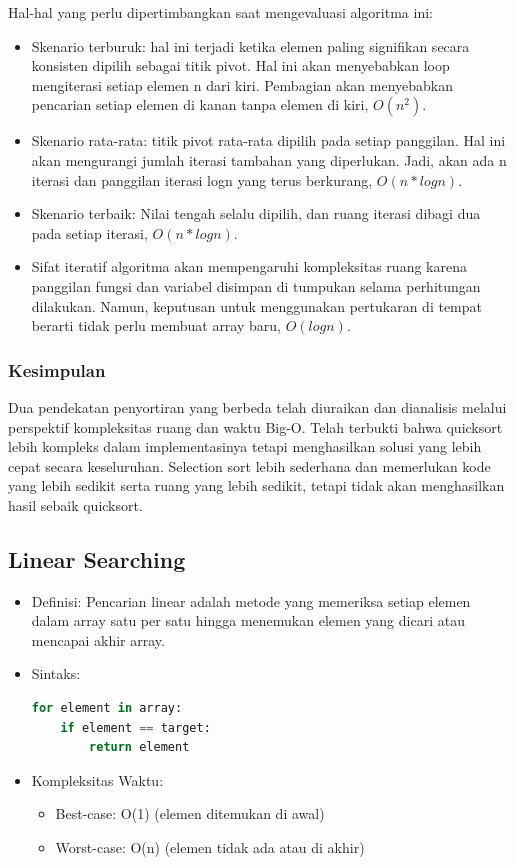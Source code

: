 \documentclass{article}
\begin{document}
Hal-hal yang perlu dipertimbangkan saat mengevaluasi algoritma ini:
\begin{itemize}
    \item Skenario terburuk: hal ini terjadi ketika elemen paling signifikan secara konsisten dipilih sebagai titik pivot. Hal ini akan menyebabkan loop mengiterasi setiap elemen n dari kiri. Pembagian akan menyebabkan pencarian setiap elemen di kanan tanpa elemen di kiri, \(O(n^2)\).
    \item Skenario rata-rata: titik pivot rata-rata dipilih pada setiap panggilan. Hal ini akan mengurangi jumlah iterasi tambahan yang diperlukan. Jadi, akan ada n iterasi dan panggilan iterasi logn yang terus berkurang, \(O(n*logn)\).
    \item Skenario terbaik: Nilai tengah selalu dipilih, dan ruang iterasi dibagi dua pada setiap iterasi, \(O(n*logn)\).
    \item Sifat iteratif algoritma akan mempengaruhi kompleksitas ruang karena panggilan fungsi dan variabel disimpan di tumpukan selama perhitungan dilakukan. Namun, keputusan untuk menggunakan pertukaran di tempat berarti tidak perlu membuat array baru, \(O(log n)\).
\end{itemize}

\subsubsection{Kesimpulan}
Dua pendekatan penyortiran yang berbeda telah diuraikan dan dianalisis melalui perspektif kompleksitas ruang dan waktu Big-O. Telah terbukti bahwa quicksort lebih kompleks dalam implementasinya tetapi menghasilkan solusi yang lebih cepat secara keseluruhan. Selection sort lebih sederhana dan memerlukan kode yang lebih sedikit serta ruang yang lebih sedikit, tetapi tidak akan menghasilkan hasil sebaik quicksort.

\subsection{Linear Searching}
\begin{itemize}
    \item Definisi: Pencarian linear adalah metode yang memeriksa setiap elemen dalam array satu per satu hingga menemukan elemen yang dicari atau mencapai akhir array.
    \item Sintaks:
          \begin{lstlisting}[language=Python, caption={}, captionpos=b]
for element in array:
    if element == target:
        return element
\end{lstlisting}
    \item Kompleksitas Waktu:
          \begin{itemize}
              \item Best-case: O(1) (elemen ditemukan di awal)
              \item Worst-case: O(n) (elemen tidak ada atau di akhir)
          \end{itemize}
\end{itemize}
\end{document}
